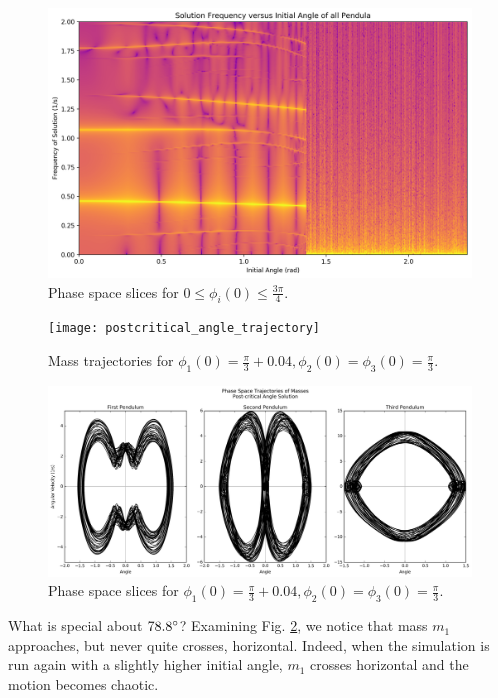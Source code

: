 \documentclass{article}
\begin{document}
\begin{figure}[ht]
	\centering
	\includegraphics[width=\textwidth]{contour_angles}
	\caption{Phase space slices for $0\le\phi_i(0)\le\frac{3\pi}{4}$.}
	\label{fig:contour_angles}
\end{figure}
\begin{figure}[ht]
    \centering
    \texttt{[image: postcritical\_angle\_trajectory]}
    \caption{Mass trajectories for $\phi_1(0)=\frac{\pi}{3}+0.04, 
    \phi_2(0)=\phi_3(0)=\frac{\pi}{3}$.}
    \label{fig:postcritical_trajectories}
\end{figure}
\begin{figure}[ht]
    \centering
    \includegraphics[width=\textwidth]{postcritical_angle_phase_space}
    \caption{Phase space slices for $\phi_1(0)=\frac{\pi}{3}+0.04, \phi_2(0) = 
    \phi_3(0)=\frac{\pi}{3}$.}
    \label{fig:postcritical_phase}
\end{figure}
        
What is special about $78.8\degree$? Examining Fig. 
\ref{fig:postcritical_trajectories}, we notice that mass $m_1$ approaches, 
but never quite crosses, horizontal.  Indeed, when the simulation is run 
again with a slightly higher initial angle, $m_1$ crosses horizontal and 
the motion becomes chaotic.
\end{document}
